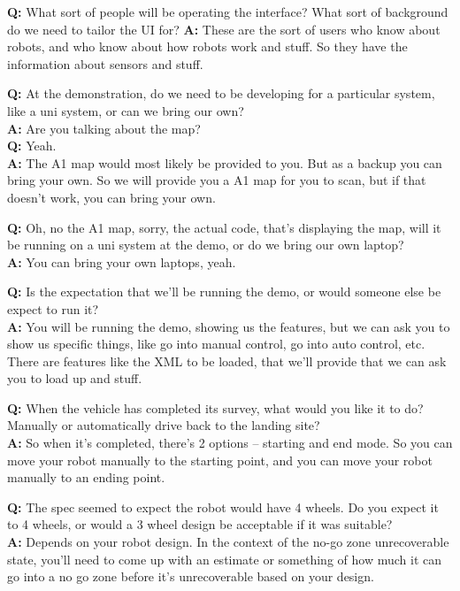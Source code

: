 \documentclass{article}
\newcounter{qcounter}
\begin{document}
\begin{list}{:~}{}
\item \textbf{Q:} What sort of people will be operating the interface? What sort of background do we need to tailor the UI for?
\textbf{A:} These are the sort of users who know about robots, and who know about how robots work and stuff. So they have the information about sensors and stuff.\\
\item \textbf{Q:} At the demonstration, do we need to be developing for a particular system, like a uni system, or can we bring our own?\\
\textbf{A:} Are you talking about the map?\\
\textbf{Q:} Yeah.\\
\textbf{A:} The A1 map would most likely be provided to you. But as a backup you can bring your own. So we will provide you a A1 map for you to scan, but if that doesn’t work, you can bring your own.\\
\item \textbf{Q:} Oh, no the A1 map, sorry, the actual code, that’s displaying the map, will it be running on a uni system at the demo, or do we bring our own laptop?\\
\textbf{A:} You can bring your own laptops, yeah.\\
\item \textbf{Q:} Is the expectation that we’ll be running the demo, or would someone else be expect to run it?\\
\textbf{A:} You will be running the demo, showing us the features, but we can ask you to show us specific things, like go into manual control, go into auto control, etc. There are features like the XML to be loaded, that we’ll provide that we can ask you to load up and stuff.\\
\item \textbf{Q:} When the vehicle has completed its survey, what would you like it to do? Manually or automatically drive back to the landing site?\\
\textbf{A:} So when it’s completed, there’s 2 options – starting and end mode. So you can move your robot manually to the starting point, and you can move your robot manually to an ending point.\\
\item \textbf{Q:} The spec seemed to expect the robot would have 4 wheels. Do you expect it to 4 wheels, or would a 3 wheel design be acceptable if it was suitable?\\
\textbf{A:} Depends on your robot design. In the context of the no-go zone unrecoverable state, you’ll need to come up with an estimate or something of how much it can go into a no go zone before it’s unrecoverable based on your design.\\

\end{list}
\end{document}
